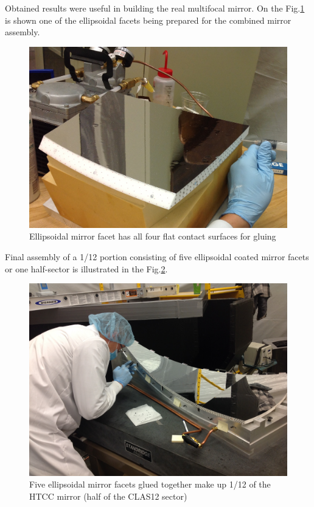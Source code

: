 \indent Obtained results were useful in building the real multifocal mirror. On the Fig.\ref{fig:facet} is shown one of the ellipsoidal facets being prepared for the combined mirror assembly.

\begin{figure}[h]
    \centering
    \includegraphics[width=1.0\linewidth]{images/Picture2.png}
    \caption{Ellipsoidal mirror facet has all four flat contact surfaces for gluing}
    \label{fig:facet}
\end{figure}

\indent Final assembly of a 1/12 portion consisting of five ellipsoidal coated mirror facets or one half-sector is illustrated in the Fig.\ref{fig:one_sector}.

\begin{figure}[h]
    \centering
    \includegraphics[trim={20cm 15cm 0 10cm },clip,width=\linewidth]{images/Picture3.JPG}
    \caption{Five ellipsoidal mirror facets glued together make up 1/12 of the HTCC mirror (half of the CLAS12 sector)}
    \label{fig:one_sector}
\end{figure}


